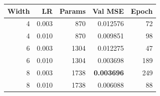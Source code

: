 \begin{center}
\small
\setlength{\tabcolsep}{4pt}
\begin{tabular}{@{}rrrrr@{}}
\toprule
Width & LR & Params & Val MSE & Epoch\\
\midrule
4 & 0.003 & 870 & 0.012576 & 72\\
4 & 0.010 & 870 & 0.009851 & 98\\
6 & 0.003 & 1304 & 0.012275 & 47\\
6 & 0.010 & 1304 & 0.003698 & 189\\
8 & 0.003 & 1738 & \textbf{0.003696} & 249\\
8 & 0.010 & 1738 & 0.006088 & 88\\
\bottomrule
\end{tabular}
\end{center}